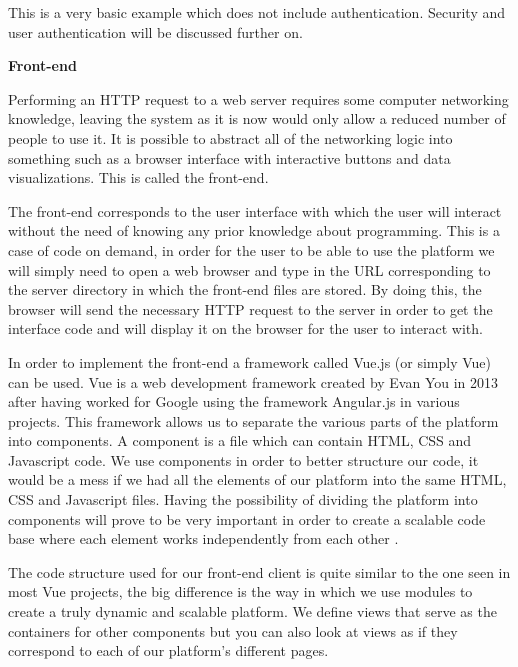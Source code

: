 This is a very basic example which does not include authentication. Security and user authentication will be discussed further on.

\vspace{4mm}
\textbf{Front-end}
\vspace{2mm}

Performing an HTTP request to a web server requires some computer networking knowledge, leaving the system as it is now would only allow a reduced number of people to use it. It is possible to abstract all of the networking logic into something such as a browser interface with interactive buttons and data visualizations. This is called the front-end.

The front-end corresponds to the user interface with which the user will interact without the need of knowing any prior knowledge about programming. This is a case of code on demand, in order for the user to be able to use the platform we will simply need to open a web browser and type in the URL corresponding to the server directory in which the front-end files are stored. By doing this, the browser will send the necessary HTTP request to the server in order to get the interface code and will display it on the browser for the user to interact with.

In order to implement the front-end a framework called Vue.js (or simply Vue) can be used. Vue is a web development framework created by Evan You in 2013 after having worked for Google using the framework Angular.js in various projects. This framework allows us to separate the various parts of the platform into components. A component is a file which can contain HTML, CSS and Javascript code. We use components in order to better structure our code, it would be a mess if we had all the elements of our platform into the same HTML, CSS and Javascript files. Having the possibility of dividing the platform into components will prove to be very important in order to create a scalable code base where each element works independently from each other \cite{Copes2018VueHandbook}.

The code structure used for our front-end client is quite similar to the one seen in most Vue projects, the big difference is the way in which we use modules to create a truly dynamic and scalable platform. We define views that serve as the containers for other components but you can also look at views as if they correspond to each of our platform's different pages.

